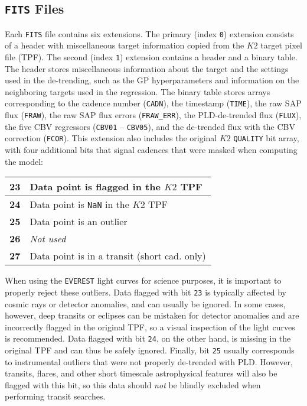 \documentclass[]{emulateapj}
\begin{document}
\subsection{\texttt{FITS} Files}
\label{sec:fits}
Each \texttt{FITS} file contains six extensions. The primary (index \texttt{0})
extension consists of a header with miscellaneous target information copied from
the $K2$ target pixel file (TPF). The second (index \texttt{1}) extension contains
a header and a binary table. The header stores miscellaneous
information about the target and the settings used in the de-trending, such as the
GP hyperparameters and information on the neighboring targets used in the regression.
The binary table stores arrays corresponding to the cadence number (\texttt{CADN}),
the timestamp (\texttt{TIME}), the raw SAP flux (\texttt{FRAW}), the raw SAP flux errors
(\texttt{FRAW\_ERR}), the PLD-de-trended flux (\texttt{FLUX}), the five CBV regressors
(\texttt{CBV01} -- \texttt{CBV05}), and the de-trended flux with the CBV
correction (\texttt{FCOR}). This extension also includes the
original $K2$ \texttt{QUALITY} bit array, with four additional bits that signal
cadences that were masked when computing the model:
%
\begin{center}
\begin{tabular}{ |l|l| }
  \hline
  \textbf{23} & Data point is flagged in the $K2$ TPF \\
  \hline
  \textbf{24} & Data point is \texttt{NaN} in the $K2$ TPF \\
  \hline
  \textbf{25} & Data point is an outlier \\
  \hline
  \textbf{26} & \emph{Not used} \\
  \hline
  \textbf{27} & Data point is in a transit (short cad. only) \\
  \hline
\end{tabular}
\end{center}
%
When using the \texttt{EVEREST} light curves for science purposes, it is important
to properly reject these outliers. Data flagged with bit \texttt{23} is typically
affected by cosmic rays or detector anomalies, and can usually be ignored. In
some cases, however, deep transits or eclipses can be mistaken for detector
anomalies and are incorrectly flagged in the original TPF, so a visual inspection
of the light curves is recommended. Data flagged with bit \texttt{24}, on the other
hand, is missing in the original TPF and can thus be safely ignored. Finally, bit
\texttt{25} usually corresponds to instrumental outliers that were not properly
de-trended with PLD. However, transits, flares, and other short timescale astrophysical
features will also be flagged with this bit, so this data should \emph{not} be
blindly excluded when performing transit searches.
\end{document}
